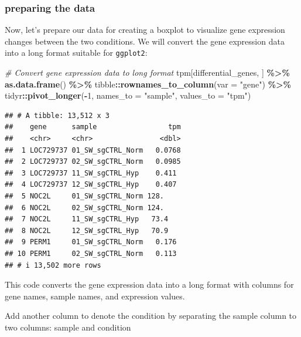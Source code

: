 \documentclass[
]{book}
\newenvironment{Shaded}{\begin{snugshade}}{\end{snugshade}}
\newcommand{\AttributeTok}[1]{\textcolor[rgb]{0.13,0.29,0.53}{#1}}
\newcommand{\CommentTok}[1]{\textcolor[rgb]{0.56,0.35,0.01}{\textit{#1}}}
\newcommand{\DecValTok}[1]{\textcolor[rgb]{0.00,0.00,0.81}{#1}}
\newcommand{\FunctionTok}[1]{\textcolor[rgb]{0.13,0.29,0.53}{\textbf{#1}}}
\newcommand{\NormalTok}[1]{#1}
\newcommand{\SpecialCharTok}[1]{\textcolor[rgb]{0.81,0.36,0.00}{\textbf{#1}}}
\newcommand{\StringTok}[1]{\textcolor[rgb]{0.31,0.60,0.02}{#1}}
\begin{document}
\hypertarget{preparing-the-data}{%
\subsubsection{preparing the data}\label{preparing-the-data}}

Now, let's prepare our data for creating a boxplot to visualize gene expression changes between the two conditions. We will convert the gene expression data into a long format suitable for \texttt{ggplot2}:

\begin{Shaded}
\begin{Highlighting}[]
\CommentTok{\# Convert gene expression data to long format}
\NormalTok{tpm[differential\_genes, ] }\SpecialCharTok{\%\textgreater{}\%}
  \FunctionTok{as.data.frame}\NormalTok{() }\SpecialCharTok{\%\textgreater{}\%}
\NormalTok{  tibble}\SpecialCharTok{::}\FunctionTok{rownames\_to\_column}\NormalTok{(}\AttributeTok{var =} \StringTok{"gene"}\NormalTok{) }\SpecialCharTok{\%\textgreater{}\%}
\NormalTok{  tidyr}\SpecialCharTok{::}\FunctionTok{pivot\_longer}\NormalTok{(}\SpecialCharTok{{-}}\DecValTok{1}\NormalTok{, }\AttributeTok{names\_to =} \StringTok{"sample"}\NormalTok{, }\AttributeTok{values\_to =} \StringTok{"tpm"}\NormalTok{)}
\end{Highlighting}
\end{Shaded}

\begin{verbatim}
## # A tibble: 13,512 x 3
##    gene      sample                 tpm
##    <chr>     <chr>                <dbl>
##  1 LOC729737 01_SW_sgCTRL_Norm   0.0768
##  2 LOC729737 02_SW_sgCTRL_Norm   0.0985
##  3 LOC729737 11_SW_sgCTRL_Hyp    0.411 
##  4 LOC729737 12_SW_sgCTRL_Hyp    0.407 
##  5 NOC2L     01_SW_sgCTRL_Norm 128.    
##  6 NOC2L     02_SW_sgCTRL_Norm 124.    
##  7 NOC2L     11_SW_sgCTRL_Hyp   73.4   
##  8 NOC2L     12_SW_sgCTRL_Hyp   70.9   
##  9 PERM1     01_SW_sgCTRL_Norm   0.176 
## 10 PERM1     02_SW_sgCTRL_Norm   0.113 
## # i 13,502 more rows
\end{verbatim}

This code converts the gene expression data into a long format with columns for gene names, sample names, and expression values.

Add another column to denote the condition by separating the sample column to two columns: sample and condition
\end{document}
